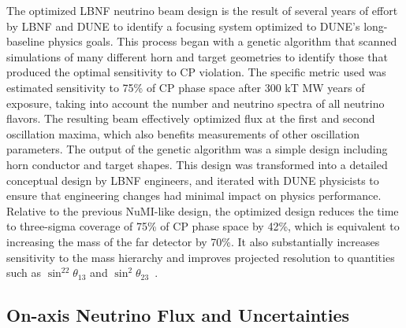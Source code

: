 The optimized LBNF neutrino beam design is the result of several years of effort by LBNF and DUNE to identify a focusing system optimized to DUNE's long-baseline physics goals.  This process began with a genetic algorithm that scanned simulations of many different horn and target geometries to identify those that produced the optimal sensitivity to CP violation.  The specific metric used was estimated sensitivity to 75\% of CP phase space after 300 kT MW years of exposure, taking into account the number and neutrino spectra of all neutrino flavors. The resulting beam effectively optimized flux at the first and second oscillation maxima, which also benefits measurements of other oscillation parameters.  The output of the genetic algorithm was a simple design including horn conductor and target shapes.  This design was transformed into a detailed conceptual design by LBNF engineers, and iterated with DUNE physicists to ensure that engineering changes had minimal impact on physics performance.  Relative to the previous NuMI-like design, the optimized design reduces the time to three-sigma coverage of 75\% of CP phase space by 42\%, which is equivalent to increasing the mass of the far detector by 70\%.  It also substantially increases sensitivity to the mass hierarchy and improves projected resolution to quantities such as $\sin^22\theta_{13}$ and $\sin^2\theta_{23}$~\cite{fields_doc_2901}.        

\subsection{On-axis Neutrino Flux and Uncertainties}

